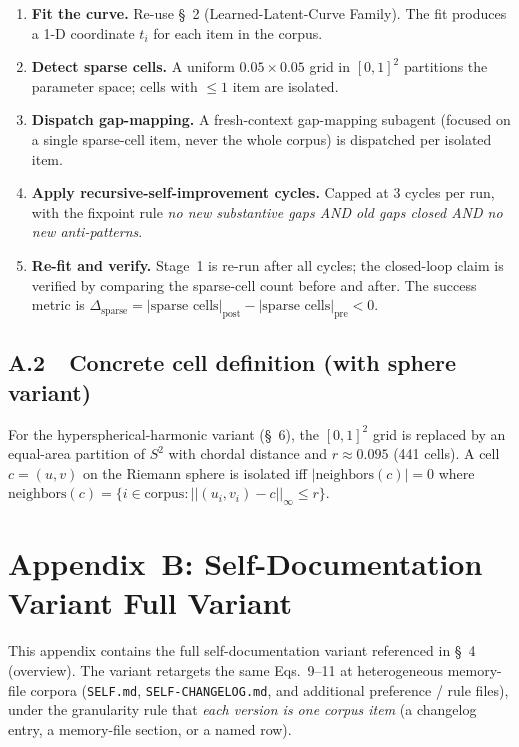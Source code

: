 \documentclass[11pt,a4paper]{article}
\begin{document}
\begin{enumerate}
\item \textbf{Fit the curve.} Re-use \S~2 (Learned-Latent-Curve Family). The fit produces a 1-D coordinate $t_i$ for each item in the corpus.
\item \textbf{Detect sparse cells.} A uniform $0.05 \times 0.05$ grid in $[0,1]^2$ partitions the parameter space; cells with $\leq 1$ item are isolated.
\item \textbf{Dispatch gap-mapping.} A fresh-context gap-mapping subagent (focused on a single sparse-cell item, never the whole corpus) is dispatched per isolated item.
\item \textbf{Apply recursive-self-improvement cycles.} Capped at 3 cycles per run, with the fixpoint rule \textit{no new substantive gaps AND old gaps closed AND no new anti-patterns}.
\item \textbf{Re-fit and verify.} Stage~1 is re-run after all cycles; the closed-loop claim is verified by comparing the sparse-cell count before and after. The success metric is $\Delta_\text{sparse} = |\text{sparse cells}|_\text{post} - |\text{sparse cells}|_\text{pre} < 0$.
\end{enumerate}

\subsection{A.2~~Concrete cell definition (with sphere variant)}

For the hyperspherical-harmonic variant (\S~6), the $[0,1]^2$ grid is replaced by an equal-area partition of $S^2$ with chordal distance and $r \approx 0.095$ (441 cells). A cell $c = (u, v)$ on the Riemann sphere is isolated iff $|\text{neighbors}(c)| = 0$ where $\text{neighbors}(c) = \{i \in \text{corpus} : ||(u_i, v_i) - c||_\infty \leq r\}$.

\section{Appendix~B: Self-Documentation Variant \textemdash{} Full Variant}

This appendix contains the full self-documentation variant referenced in \S~4 (overview). The variant retargets the same Eqs.~9--11 at heterogeneous memory-file corpora (\texttt{SELF.md}, \texttt{SELF-CHANGELOG.md}, and additional preference / rule files), under the granularity rule that \textit{each version is one corpus item} (a changelog entry, a memory-file section, or a named row).
\end{document}
